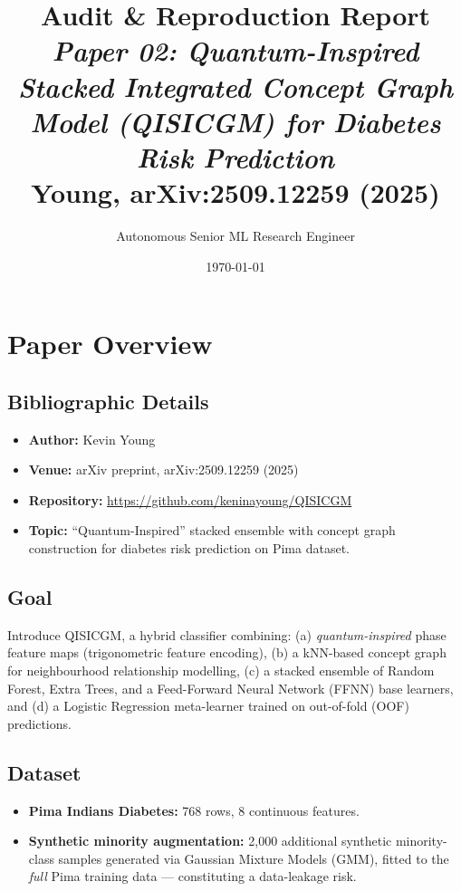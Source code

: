 \documentclass[12pt,a4paper]{article}
\title{\textbf{Audit \& Reproduction Report}\\[0.4em]
\large\textit{Paper 02: Quantum-Inspired Stacked Integrated Concept Graph Model (QISICGM) for Diabetes Risk Prediction}\\[0.3em]
Young, arXiv:2509.12259 (2025)}
\author{Autonomous Senior ML Research Engineer}
\date{\today}
\begin{document}
\maketitle
\tableofcontents
\newpage

\section{Paper Overview}
\subsection{Bibliographic Details}
\begin{itemize}[leftmargin=*]
  \item \textbf{Author:} Kevin Young
  \item \textbf{Venue:} arXiv preprint, arXiv:2509.12259 (2025)
  \item \textbf{Repository:} \url{https://github.com/keninayoung/QISICGM}
  \item \textbf{Topic:} ``Quantum-Inspired'' stacked ensemble with concept graph construction for diabetes risk prediction on Pima dataset.
\end{itemize}

\subsection{Goal}
Introduce QISICGM, a hybrid classifier combining:
(a) \emph{quantum-inspired} phase feature maps (trigonometric feature encoding),
(b) a kNN-based concept graph for neighbourhood relationship modelling,
(c) a stacked ensemble of Random Forest, Extra Trees, and a Feed-Forward Neural Network (FFNN) base learners, and
(d) a Logistic Regression meta-learner trained on out-of-fold (OOF) predictions.

\subsection{Dataset}
\begin{itemize}[leftmargin=*]
  \item \textbf{Pima Indians Diabetes:} 768 rows, 8 continuous features.
  \item \textbf{Synthetic minority augmentation:} 2,000 additional synthetic minority-class samples generated via Gaussian Mixture Models (GMM), fitted to the \emph{full} Pima training data --- constituting a data-leakage risk.
\end{itemize}
\end{document}
